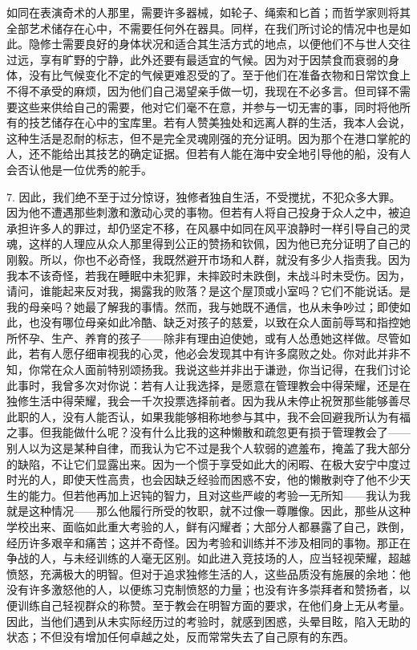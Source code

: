 如同在表演奇术的人那里，需要许多器械，如轮子、绳索和匕首；而哲学家则将其全部艺术储存在心中，不需要任何外在器具。同样，在我们所讨论的情况中也是如此。隐修士需要良好的身体状况和适合其生活方式的地点，以便他们不与世人交往过远，享有旷野的宁静，此外还要有最适宜的气候。因为对于因禁食而衰弱的身体，没有比气候变化不定的气候更难忍受的了。至于他们在准备衣物和日常饮食上不得不承受的麻烦，因为他们自己渴望亲手做一切，我现在不必多言。但司铎不需要这些来供给自己的需要，他对它们毫不在意，并参与一切无害的事，同时将他所有的技艺储存在心中的宝库里。若有人赞美独处和远离人群的生活，我本人会说，这种生活是忍耐的标志，但不是完全灵魂刚强的充分证明。因为那个在港口掌舵的人，还不能给出其技艺的确定证据。但若有人能在海中安全地引导他的船，没有人会否认他是一位优秀的舵手。\par

7. 因此，我们绝不至于过分惊讶，独修者独自生活，不受搅扰，不犯众多大罪。因为他不遭遇那些刺激和激动心灵的事物。但若有人将自己投身于众人之中，被迫承担许多人的罪过，却仍坚定不移，在风暴中如同在风平浪静时一样引导自己的灵魂，这样的人理应从众人那里得到公正的赞扬和钦佩，因为他已充分证明了自己的刚毅。所以，你也不必奇怪，我既然避开市场和人群，就没有多少人指责我。因为我本不该奇怪，若我在睡眠中未犯罪，未摔跤时未跌倒，未战斗时未受伤。因为，请问，谁能起来反对我，揭露我的败落？是这个屋顶或小室吗？它们不能说话。是我的母亲吗？她最了解我的事情。然而，我与她既不通信，也从未争吵过；即使如此，也没有哪位母亲如此冷酷、缺乏对孩子的慈爱，以致在众人面前辱骂和指控她所怀孕、生产、养育的孩子——除非有理由迫使她，或有人怂恿她这样做。尽管如此，若有人愿仔细审视我的心灵，他必会发现其中有许多腐败之处。你对此并非不知，你常在众人面前特别颂扬我。我说这些并非出于谦逊，你当记得，在我们讨论此事时，我曾多次对你说：若有人让我选择，是愿意在管理教会中得荣耀，还是在独修生活中得荣耀，我会一千次投票选择前者。因为我从未停止祝贺那些能够善尽此职的人，没有人能否认，如果我能够相称地参与其中，我不会回避我所认为有福之事。但我能做什么呢？没有什么比我的这种懒散和疏忽更有损于管理教会了——别人以为这是某种自律，而我认为它不过是我个人软弱的遮羞布，掩盖了我大部分的缺陷，不让它们显露出来。因为一个惯于享受如此大的闲暇、在极大安宁中度过时光的人，即使天性高贵，也会因缺乏经验而困惑不安，他的懒散剥夺了他不少天生的能力。但若他再加上迟钝的智力，且对这些严峻的考验一无所知——我认为我就是这种情况——那么他履行所受的牧职，就不过像一尊雕像。因此，那些从这种学校出来、面临如此重大考验的人，鲜有闪耀者；大部分人都暴露了自己，跌倒，经历许多艰辛和痛苦；这并不奇怪。因为考验和训练并不涉及相同的事物。那正在争战的人，与未经训练的人毫无区别。如此进入竞技场的人，应当轻视荣耀，超越愤怒，充满极大的明智。但对于追求独修生活的人，这些品质没有施展的余地：他没有许多激怒他的人，以便练习克制愤怒的力量；也没有许多崇拜者和赞扬者，以便训练自己轻视群众的称赞。至于教会在明智方面的要求，在他们身上无从考量。因此，当他们遇到从未实际经历过的考验时，就感到困惑，头晕目眩，陷入无助的状态；不但没有增加任何卓越之处，反而常常失去了自己原有的东西。\par

